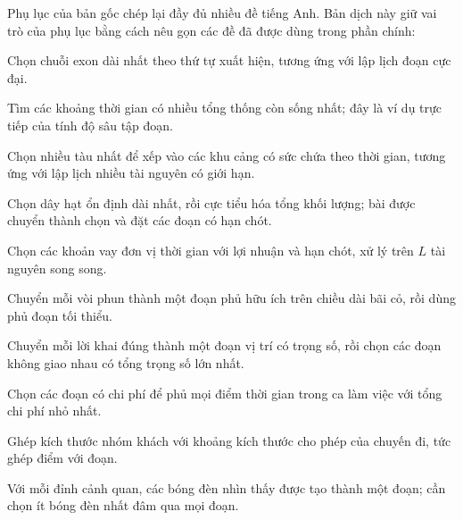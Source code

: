 \documentclass[11pt]{article}
\begin{document}
Phụ lục của bản gốc chép lại đầy đủ nhiều đề tiếng Anh. Bản dịch này giữ vai
trò của phụ lục bằng cách nêu gọn các đề đã được dùng trong phần chính:
\begin{description}[leftmargin=2.8em,style=nextline]
  \item[Gene Assembly] Chọn chuỗi exon dài nhất theo thứ tự xuất hiện, tương
  ứng với lập lịch đoạn cực đại.
  \item[Who is Still Alive?] Tìm các khoảng thời gian có nhiều tổng thống còn
  sống nhất; đây là ví dụ trực tiếp của tính độ sâu tập đoạn.
  \item[Berth Allocation] Chọn nhiều tàu nhất để xếp vào các khu cảng có sức
  chứa theo thời gian, tương ứng với lập lịch nhiều tài nguyên có giới hạn.
  \item[Pendant] Chọn dây hạt ổn định dài nhất, rồi cực tiểu hóa tổng khối
  lượng; bài được chuyển thành chọn và đặt các đoạn có hạn chót.
  \item[Loan Scheduling] Chọn các khoản vay đơn vị thời gian với lợi nhuận và
  hạn chót, xử lý trên \(L\) tài nguyên song song.
  \item[Watering Grass] Chuyển mỗi vòi phun thành một đoạn phủ hữu ích trên
  chiều dài bãi cỏ, rồi dùng phủ đoạn tối thiểu.
  \item[Joke with Turtles] Chuyển mỗi lời khai đúng thành một đoạn vị trí có
  trọng số, rồi chọn các đoạn không giao nhau có tổng trọng số lớn nhất.
  \item[Cleaning Shifts] Chọn các đoạn có chi phí để phủ mọi điểm thời gian
  trong ca làm việc với tổng chi phí nhỏ nhất.
  \item[Trips] Ghép kích thước nhóm khách với khoảng kích thước cho phép của
  chuyến đi, tức ghép điểm với đoạn.
  \item[Enlightened Landscape] Với mỗi đỉnh cảnh quan, các bóng đèn nhìn thấy
  được tạo thành một đoạn; cần chọn ít bóng đèn nhất đâm qua mọi đoạn.
\end{description}
\end{document}
